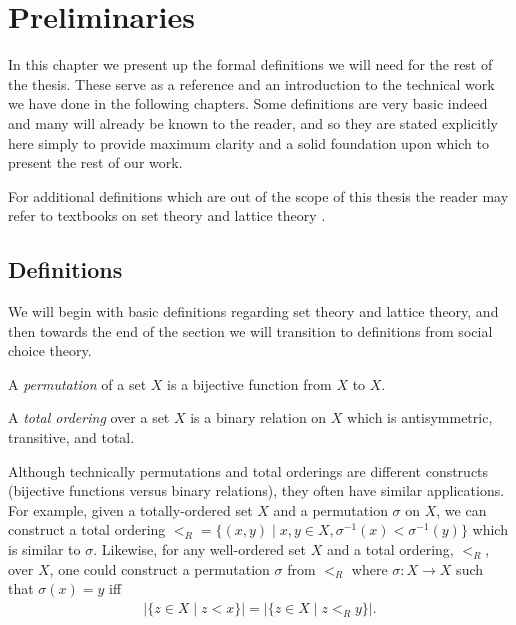 
\chapter{Preliminaries}

	In this chapter we present up the formal definitions we will need for the rest of the thesis. These serve as a reference and an introduction to the technical work we have done in the following chapters. Some definitions are very basic indeed and many will already be known to the reader, and so they are stated explicitly here simply to provide maximum clarity and a solid foundation upon which to present the rest of our work.

	For additional definitions which are out of the scope of this thesis the reader may refer to textbooks on set theory \cite{kunen1980set} and lattice theory \cite{birkhoff1995lattice}.

\section{Definitions}

	We will begin with basic definitions regarding set theory and lattice theory, and then towards the end of the section we will transition to definitions from social choice theory.

	\begin{definition}
		A \emph{permutation} of a set $X$ is a bijective function from $X$ to $X$.
	\end{definition}

	\begin{definition}
		A \emph{total ordering} over a set $X$ is a binary relation on $X$ which is antisymmetric, transitive, and total.
	\end{definition}

	Although technically permutations and total orderings are different constructs (bijective functions versus binary relations), they often have similar applications. For example, given a totally-ordered set $X$ and a permutation $\sigma$ on $X$, we can construct a total ordering $<_R = \{(x,y) \mid x, y \in X, \sigma^{-1}(x) < \sigma^{-1}(y)\}$ which is similar to $\sigma$. Likewise, for any well-ordered set $X$ and a total ordering, $<_R$, over $X$, one could construct a permutation $\sigma$ from $<_R$ where $\sigma : X \to X$ such that $\sigma(x) = y$ iff
	\begin{align*}
		|\{z \in X \mid z < x\}| = |\{z \in X \mid z <_R y\}|.
	\end{align*}

